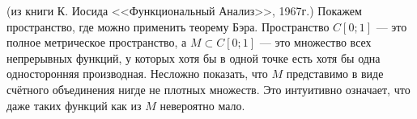 \begin{example} (из книги К. Иосида <<Функциональный Анализ>>, 1967г.)
	Покажем пространство, где можно применить теорему Бэра. Пространство $C[0; 1]$ --- это полное метрическое пространство, а $M \subset C[0; 1]$ --- это множество всех непрерывных функций, у которых хотя бы в одной точке есть хотя бы одна односторонняя производная. Несложно показать, что $M$ представимо в виде счётного объединения нигде не плотных множеств. Это интуитивно означает, что даже таких функций как из $M$ невероятно мало.
\end{example}